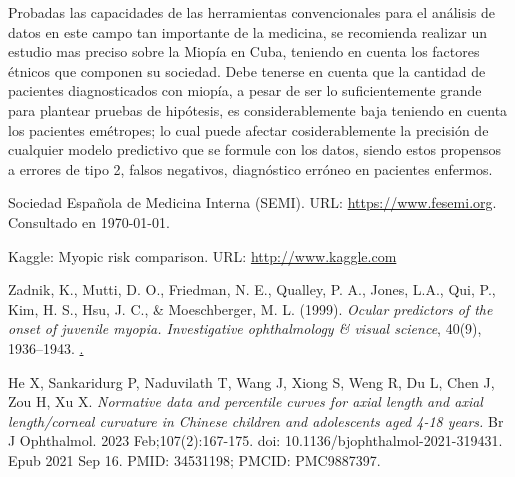 \documentclass[a4paper,10pt,twocolumn]{article}
\begin{document}
 Probadas las capacidades de las herramientas convencionales para el análisis de datos en este campo tan importante de la medicina, se recomienda realizar un estudio mas preciso sobre la Miopía en Cuba, teniendo en cuenta los factores étnicos que componen su sociedad. Debe tenerse en cuenta que la cantidad de pacientes diagnosticados con miopía, a pesar de ser lo suficientemente grande para plantear pruebas de hipótesis, es considerablemente baja teniendo en cuenta los pacientes emétropes; lo cual puede afectar cosiderablemente la precisión de cualquier modelo predictivo que se formule con los datos, siendo estos propensos a errores de tipo 2, falsos negativos, diagnóstico erróneo en pacientes enfermos.




\begin{thebibliography}{99}
	 Sociedad Española de Medicina Interna (SEMI). URL: \href{https://www.fesemi.org/informacion-pacientes/conozca-mejor-su-enfermedad/miopia}
	{https://www.fesemi.org}.
	Consultado en \today.
	
	 Kaggle: Myopic risk comparison. URL:
	\href{https://www.kaggle.com/code/maryanalyze/myopia-risk-compare-lr-ebm-gbdt-model-performance}
		{http://www.kaggle.com}
		
	 Zadnik, K., Mutti, D. O., Friedman, N. E., Qualley, P. A., Jones, L.A., Qui, P., Kim, H. S., Hsu, J. C., \& Moeschberger, M. L. (1999). \emph{Ocular predictors of the onset of juvenile myopia. Investigative ophthalmology \& visual science}, 40(9), 1936–1943. \href{https://pubmed.ncbi.nlm.nih.gov/10440246/}.

	 He X, Sankaridurg P, Naduvilath T, Wang J, Xiong S, Weng R, Du L, Chen J, Zou H, Xu X. \emph{Normative data and percentile curves for axial length and axial length/corneal curvature in Chinese children and adolescents aged 4-18 years.} Br J Ophthalmol. 2023 Feb;107(2):167-175. doi: 10.1136/bjophthalmol-2021-319431. Epub 2021 Sep 16. PMID: 34531198; PMCID: PMC9887397.
	
	
%
%

\end{thebibliography}


\label{end}
\end{document}
